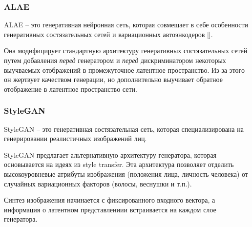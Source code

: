\subsubsection{ALAE}

ALAE \cite{ALAE} – это генеративная нейронная сеть, которая совмещает в себе особенности генеративных состязательных сетей и вариационных автоэнкодеров [].

Она модифицирует стандартную архитектуру генеративных состязательных сетей путем добавления \emph{перед} генератором и \emph{перед} дискриминатором некоторых выучваемых отображений в промежуточное латентное пространство.
Из-за этого он жертвует качеством генерации, но дополнительно выучивает обратное отображение в латентное пространство сети.

\subsubsection{StyleGAN}
StyleGAN \cite{StyleGAN} – это генеративная состязательная сеть, которая специализирована на генерировании реалистичных изображений лиц. 

StyleGAN предлагает альтернативную архитектуру генератора, которая основывается на идеях из style transfer. Эта архитектура позволяет отделить высокоуровневые атрибуты изображения (положения лица, личность человека) от случайных вариационных факторов (волосы, веснушки и т.п.).

Синтез изображения начинается с фиксированного входного вектора, а информация о латентном представлениии встраивается на каждом слое генератора.

